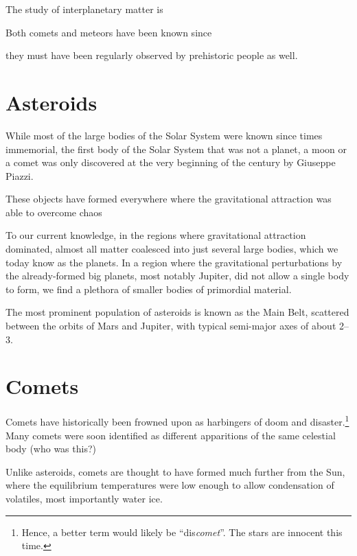 
The study of interplanetary matter is 

Both comets and meteors have been known since 

they must have been regularly observed by prehistoric people as well.



\section{Asteroids} \label{aa}
    While most of the large bodies of the Solar System were known since times immemorial,
    the first body of the Solar System that was not a planet, a moon or a comet was only discovered at
    the very beginning of the  century by Giuseppe Piazzi.

    These objects have formed everywhere where the gravitational attraction was able to overcome chaos \citep{???}

    To our current knowledge, in the regions where gravitational attraction dominated, almost all matter
    coalesced into just several large bodies, which we today know as the planets.
    In a region where the gravitational perturbations by the already-formed big planets, most notably Jupiter,
    did not allow a single body to form, we find a plethora of smaller bodies of primordial material.

    The most prominent population of asteroids is known as the Main Belt, scattered between the orbits
    of Mars and Jupiter, with typical semi-major axes of about \SIrange{2}{3}{\au}.

\section{Comets} \label{ac}
    Comets have historically been frowned upon as harbingers of doom and disaster.\footnote{Hence,
    a better term would likely be ``dis\textit{comet}''. The stars are innocent this time.}
    Many comets were soon identified as different apparitions of the same celestial body (who was this?)

    Unlike asteroids, comets are thought to have formed much further from the Sun, where the equilibrium
    temperatures were low enough to allow condensation of volatiles, most importantly water ice.

